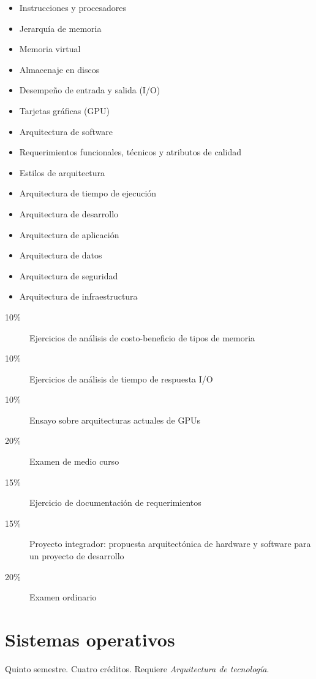 \documentclass{article}
\begin{document}
\begin{multicols}{4}
\begin{itemize}
\item{Instrucciones y procesadores}
\item{Jerarqu\'{i}a de memoria}
\item{Memoria virtual}
\item{Almacenaje en discos}
\item{Desempe\~{n}o de entrada y salida (I/O)}
\item{Tarjetas gr\'{a}ficas (GPU)}
\item{Arquitectura de software}
\item{Requerimientos funcionales, t\'{e}cnicos y atributos de calidad}
\item{Estilos de arquitectura}
\item{Arquitectura de tiempo de ejecuci\'{o}n}
\item{Arquitectura de desarrollo}
\item{Arquitectura de aplicaci\'{o}n}
\item{Arquitectura de datos}
\item{Arquitectura de seguridad}
\item{Arquitectura de infraestructura}
\end{itemize}

\begin{description}
\item[10\%]{Ejercicios de an\'{a}lisis de costo-beneficio de tipos de
  memoria}
\item[10\%]{Ejercicios de an\'{a}lisis de tiempo de respuesta I/O}
\item[10\%]{Ensayo sobre arquitecturas actuales de GPUs}
\item[20\%]{Examen de medio curso}
\item[15\%]{Ejercicio de documentaci\'{o}n de requerimientos}
\item[15\%]{Proyecto integrador: propuesta arquitect\'{o}nica de hardware
  y software para un proyecto de desarrollo}
\item[20\%]{Examen ordinario}
\end{description}  

\vfill\null \columnbreak

\hypertarget{so}{\section*{Sistemas operativos}}  

Quinto semestre. Cuatro cr\'{e}ditos. Requiere {\em Arquitectura de
  tecnolog\'{i}a}.


\end{multicols}
\end{document}
